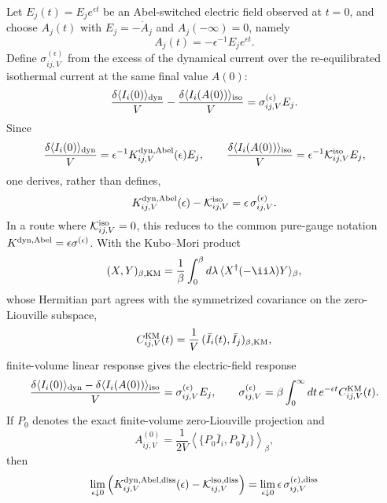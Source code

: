 \begin{proposition}
Let \(E_j(t)=E_j e^{\epsilon t}\) be an Abel-switched electric field observed
at \(t=0\), and choose \(A_j(t)\) with \(E_j=-\dot A_j\) and
\(A_j(-\infty)=0\), namely
\[
  A_j(t)=-\epsilon^{-1}E_j e^{\epsilon t}.
\]
Define \(\sigma^{(\epsilon)}_{ij,V}\) from the excess of the dynamical current
over the re-equilibrated isothermal current at the same final value \(A(0)\):
\[
  \frac{\delta\langle I_i(0)\rangle_{\rm dyn}}{V}
  -
  \frac{\delta\langle I_i(A(0))\rangle_{\rm iso}}{V}
  =
  \sigma^{(\epsilon)}_{ij,V}E_j .
\]
Since
\[
  \frac{\delta\langle I_i(0)\rangle_{\rm dyn}}{V}
  =
  \epsilon^{-1}K^{\rm dyn,Abel}_{ij,V}(\epsilon)E_j,
  \qquad
  \frac{\delta\langle I_i(A(0))\rangle_{\rm iso}}{V}
  =
  \epsilon^{-1}\mathcal K^{\rm iso}_{ij,V}E_j,
\]
one derives, rather than defines,
\begin{equation}
  K^{\rm dyn,Abel}_{ij,V}(\epsilon)
  -
  \mathcal K^{\rm iso}_{ij,V}
  =
  \epsilon\,\sigma^{(\epsilon)}_{ij,V}.
  \label{eq:kubo-abel-vector-potential-mismatch-definition}
\end{equation}
In a route where \(\mathcal K^{\rm iso}_{ij,V}=0\), this reduces to the common
pure-gauge notation \(K^{\rm dyn,Abel}=\epsilon\sigma^{(\epsilon)}\).
With the
Kubo--Mori product
\[
  (X,Y)_{\beta,{\rm KM}}
  =
  \frac1\beta\int_0^\beta d\lambda\,
  \langle X^\dagger(-\ii\lambda)Y\rangle_\beta ,
\]
whose Hermitian part agrees with the symmetrized covariance on the
zero-Liouville subspace,
\[
  C^{\rm KM}_{ij,V}(t)
  =
  \frac1V\,(\bar I_i(t),\bar I_j)_{\beta,{\rm KM}},
\]
finite-volume linear response gives the electric-field response
\begin{equation}
  \frac{\delta\langle I_i(0)\rangle_{\rm dyn}
        -\delta\langle I_i(A(0))\rangle_{\rm iso}}{V}
  =
  \sigma^{(\epsilon)}_{ij,V}E_j,
  \qquad
  \sigma^{(\epsilon)}_{ij,V}
  =
  \beta\int_0^\infty dt\,e^{-\epsilon t}C^{\rm KM}_{ij,V}(t).
  \label{eq:kubo-abel-source-response-conductivity}
\end{equation}
If \(P_0\) denotes the exact finite-volume zero-Liouville projection and
\begin{equation}
  A^{(0)}_{ij,V}
  =
  \frac1{2V}
  \left\langle
    \{P_0\bar I_i,P_0\bar I_j\}
  \right\rangle_\beta ,
  \label{eq:kubo-zero-mode-current-covariance}
\end{equation}
then
\begin{equation}
  \lim_{\epsilon\downarrow0}
  \left(
    K^{\rm dyn,Abel,diss}_{ij,V}(\epsilon)
    -\mathcal K^{\rm iso,diss}_{ij,V}
  \right)
  =
  \lim_{\epsilon\downarrow0}
  \epsilon\,\sigma^{(\epsilon),{\rm diss}}_{ij,V}

\end{equation}
\end{proposition}
